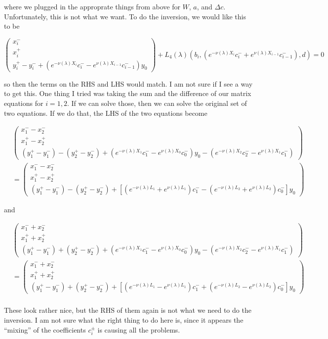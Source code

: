 \documentclass[12pt]{article}
\begin{document}
\begin{enumerate}
where we plugged in the approprate things from above for $W$, $a$, and $\Delta c$. Unfortunately, this is not what we want. To do the inversion, we would like this to be

\[
\begin{pmatrix}x_i^- \\ x_i^+ \\ y_i^+ - y_i^- + (e^{-\nu(\lambda)X_i} c_i^- - e^{\nu(\lambda)X_{i-1}} c_{i-1}^-) y_0 \end{pmatrix} + L_4(\lambda)(b_i, (e^{-\nu(\lambda)X_i} c_i^- + e^{\nu(\lambda)X_{i-1}} c_{i-1}^-), d) = 0
\]

so then the terms on the RHS and LHS would match. I am not sure if I see a way to get this. One thing I tried was taking the sum and the difference of our matrix equations for $i = 1, 2$. If we can solve those, then we can solve the original set of two equations. If we do that, the LHS of the two equations become

\begin{align*}
&\begin{pmatrix}x_1^- - x_2^- \\ x_1^+ - x_2^+ \\ (y_1^+ - y_1^-) - (y_2^+ - y_2^-) + (e^{-\nu(\lambda)X_1} c_1^- - e^{\nu(\lambda)X_{0}} c_{0}^-) y_0 - (e^{-\nu(\lambda)X_2} c_2^- - e^{\nu(\lambda)X_{1}} c_{1}^-)\end{pmatrix} \\
&= \begin{pmatrix}x_1^- - x_2^- \\ x_1^+ - x_2^+ \\ (y_1^+ - y_1^-) - (y_2^+ - y_2^-) + [(e^{-\nu(\lambda)L_1} + e^{\nu(\lambda)L_1}) c_1^- - (e^{-\nu(\lambda)L_2} + e^{\nu(\lambda)L_2})c_0^-]y_0 \end{pmatrix} 
\end{align*}

and 

\begin{align*}
&\begin{pmatrix}x_1^- + x_2^- \\ x_1^+ + x_2^+ \\ (y_1^+ - y_1^-) + (y_2^+ - y_2^-) + (e^{-\nu(\lambda)X_1} c_1^- - e^{\nu(\lambda)X_{0}} c_{0}^-) y_0 - (e^{-\nu(\lambda)X_2} c_2^- - e^{\nu(\lambda)X_{1}} c_{1}^-)\end{pmatrix} \\
&= \begin{pmatrix}x_1^- + x_2^- \\ x_1^+ + x_2^+ \\ (y_1^+ - y_1^-) + (y_2^+ - y_2^-) + [(e^{-\nu(\lambda)L_1} - e^{\nu(\lambda)L_1}) c_1^- + (e^{-\nu(\lambda)L_2} - e^{\nu(\lambda)L_2})c_0^-]y_0 \end{pmatrix} \\
\end{align*}

These look rather nice, but the RHS of them again is not what we need to do the inversion. I am not sure what the right thing to do here is, since it appears the ``mixing'' of the coefficients $c_i^\pm$ is causing all the problems.


\end{enumerate}
\end{document}
